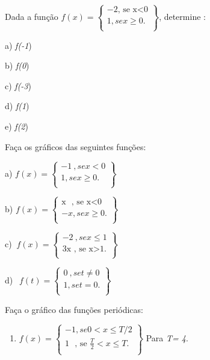 \begin{exercicios}

	\exitem{} Dada a função  \( f \left( x \right) = \left\{ \begin{matrix}
-2\text{, se x<0}\\
1 , se x \geq 0.\\
\end{matrix}\right\}
  \), determine :

\begin{multicols}{5}
	a) \textit{f(-1})
	
	b) \textit{f(0})
	
	c) \textit{f(-3})
	
	d) \textit{f(1})
	
	e) \textit{f(2})
\end{multicols}

	\exitem{} Faça os gráficos das seguintes funções:

\begin{multicols}{2}
	a) \( f \left( x \right) = \left\{ \begin{matrix}
	-1~ , se x<0\\
	1 , se x \geq 0.\\
	\end{matrix}\right\}
  	\)  

	b) \( f \left( x \right) = \left\{ \begin{matrix}
	\text{x~ , se x<0}\\
	-x , se x \geq 0.\\
	\end{matrix}\right\}
	\)

	c) \( ~f \left( x \right) = \left\{ \begin{matrix}
	-2~ , se x \leq 1\\
	\text{3x , se x>1.}\\
	\end{matrix}\right\}
	\)
	
	d) \( ~~f \left( t \right) = \left\{ \begin{matrix}
	0~, se t \neq 0\\
	1 , se t=0.\\
	\end{matrix}\right\}
	\) 
\end{multicols}

	\exitem{} Faça o gráfico das funções periódicas:

\begin{enumerate}[label=\alph*]
	\item \( f \left( x \right) = \left\{ \begin{matrix}
	-1 , se 0< x \leq T/2\\
	\text{1~ , se }\frac{T}{2}< x \leq T.\\
	\end{matrix}\right\}
	\)
	Para\textit{ T= 4}.
	

\end{enumerate}
\end{exercicios}
